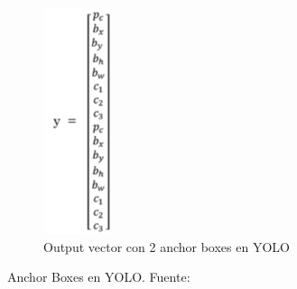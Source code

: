 \begin{figure}[p]
\begin{subfigure}[h!]{.15\textwidth}
        \includegraphics[width=\linewidth]{img/anchor-boxes-yolo-3.png}
        \caption{Output vector con 2 anchor boxes en YOLO}
    \end{subfigure}
    \caption{Anchor Boxes en YOLO.  Fuente:\cite{cnncourse}}
    \label{fig:anchor boxes en YOLO}
\end{figure}


